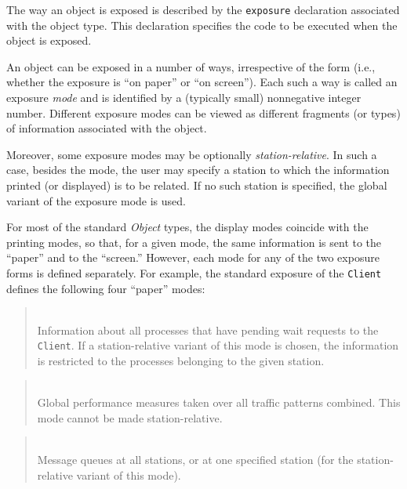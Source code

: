 The way an object is exposed is described by the {\tt exposure} declaration
associated with the object type.
This declaration specifies the code to be executed when the object is
exposed.

An object can be exposed in a number of ways, irrespective of the form (i.e.,
whether the exposure is ``on paper'' or ``on screen'').
Each such a way is called an exposure {\em mode\/} and is identified by
a (typically small) nonnegative integer number.
Different exposure modes can be viewed as different fragments (or types)
of information associated with the object.

Moreover, some exposure modes may be optionally {\em station-relative}.
In such a case, besides the mode, the user may specify a station to
which the information printed (or displayed) is to be related.
If no such station is specified, the global variant of the exposure
mode is used.

For most of the standard {\em Object\/} types, the display modes
coincide with the printing modes, so that, for a given mode,
the same information is sent to the ``paper'' and to the ``screen.''
However, each mode for any of the two exposure forms is defined
separately.
For example, the standard exposure of the {\tt Client} defines the following
four ``paper'' modes:

\medskip

\begin{quote}
\noindent{}\\ \hspace{0in}
Information about all processes that have pending wait requests to the
{\tt Client}.
If a station-relative variant of this mode is chosen, the information
is restricted to the processes belonging to the given station.
\end{quote}

\begin{quote}
\noindent{}\\ \hspace{0in}
Global performance measures taken over all traffic patterns combined.
This mode cannot be made station-relative.
\end{quote}

\begin{quote}
\noindent{}\\ \hspace{0in}
Message queues at all stations, or at one specified station (for the
station-relative variant of this mode).
\end{quote}

